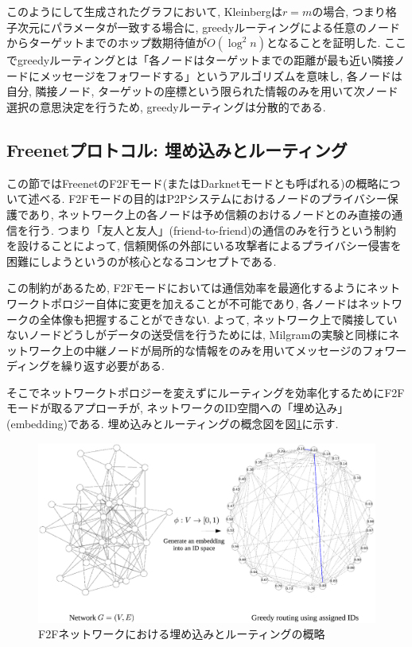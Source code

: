 \documentclass[dvipdfmx]{ampbt}
\begin{document}
   このようにして生成されたグラフにおいて, Kleinbergは$r=m$の場合, つまり格子次元にパラメータが一致する場合に, greedyルーティングによる任意のノードからターゲットまでのホップ数期待値が$O(\log^2n)$となることを証明した. ここでgreedyルーティングとは「各ノードはターゲットまでの距離が最も近い隣接ノードにメッセージをフォワードする」というアルゴリズムを意味し, 各ノードは自分, 隣接ノード, ターゲットの座標という限られた情報のみを用いて次ノード選択の意思決定を行うため, greedyルーティングは分散的である.


   \subsection{Freenetプロトコル: 埋め込みとルーティング} \label{sec:freenetprotocols}
   この節ではFreenetのF2Fモード(またはDarknetモードとも呼ばれる)の概略について述べる. F2Fモードの目的はP2Pシステムにおけるノードのプライバシー保護であり, ネットワーク上の各ノードは予め信頼のおけるノードとのみ直接の通信を行う. つまり「友人と友人」(friend-to-friend)の通信のみを行うという制約を設けることによって, 信頼関係の外部にいる攻撃者によるプライバシー侵害を困難にしようというのが核心となるコンセプトである.

   この制約があるため, F2Fモードにおいては通信効率を最適化するようにネットワークトポロジー自体に変更を加えることが不可能であり, 各ノードはネットワークの全体像も把握することができない. よって, ネットワーク上で隣接していないノードどうしがデータの送受信を行うためには, Milgramの実験と同様にネットワーク上の中継ノードが局所的な情報をのみを用いてメッセージのフォワーディングを繰り返す必要がある. 

   そこでネットワークトポロジーを変えずにルーティングを効率化するためにF2Fモードが取るアプローチが, ネットワークのID空間への「埋め込み」(embedding)である. 埋め込みとルーティングの概念図を図\ref{fig:f2f_overview}に示す.

   \begin{figure}[htbp]
    \centerline{\includegraphics[width=150mm]{../fig/greedy_embedding_overview.eps}}
    \caption{F2Fネットワークにおける埋め込みとルーティングの概略}
    \label{fig:f2f_overview}
   \end{figure}
\end{document}
